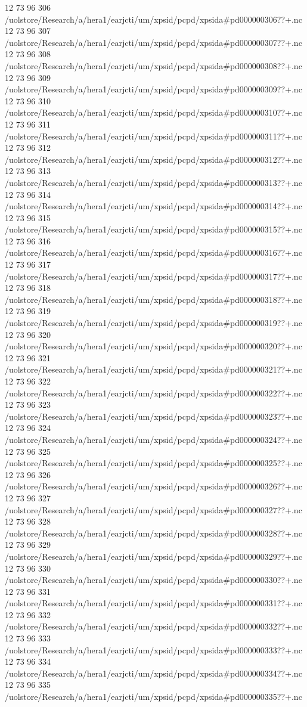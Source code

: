 12 73 96
306
/uolstore/Research/a/hera1/earjcti/um/xpsid/pcpd/xpsida#pd000000306??+.nc
12 73 96
307
/uolstore/Research/a/hera1/earjcti/um/xpsid/pcpd/xpsida#pd000000307??+.nc
12 73 96
308
/uolstore/Research/a/hera1/earjcti/um/xpsid/pcpd/xpsida#pd000000308??+.nc
12 73 96
309
/uolstore/Research/a/hera1/earjcti/um/xpsid/pcpd/xpsida#pd000000309??+.nc
12 73 96
310
/uolstore/Research/a/hera1/earjcti/um/xpsid/pcpd/xpsida#pd000000310??+.nc
12 73 96
311
/uolstore/Research/a/hera1/earjcti/um/xpsid/pcpd/xpsida#pd000000311??+.nc
12 73 96
312
/uolstore/Research/a/hera1/earjcti/um/xpsid/pcpd/xpsida#pd000000312??+.nc
12 73 96
313
/uolstore/Research/a/hera1/earjcti/um/xpsid/pcpd/xpsida#pd000000313??+.nc
12 73 96
314
/uolstore/Research/a/hera1/earjcti/um/xpsid/pcpd/xpsida#pd000000314??+.nc
12 73 96
315
/uolstore/Research/a/hera1/earjcti/um/xpsid/pcpd/xpsida#pd000000315??+.nc
12 73 96
316
/uolstore/Research/a/hera1/earjcti/um/xpsid/pcpd/xpsida#pd000000316??+.nc
12 73 96
317
/uolstore/Research/a/hera1/earjcti/um/xpsid/pcpd/xpsida#pd000000317??+.nc
12 73 96
318
/uolstore/Research/a/hera1/earjcti/um/xpsid/pcpd/xpsida#pd000000318??+.nc
12 73 96
319
/uolstore/Research/a/hera1/earjcti/um/xpsid/pcpd/xpsida#pd000000319??+.nc
12 73 96
320
/uolstore/Research/a/hera1/earjcti/um/xpsid/pcpd/xpsida#pd000000320??+.nc
12 73 96
321
/uolstore/Research/a/hera1/earjcti/um/xpsid/pcpd/xpsida#pd000000321??+.nc
12 73 96
322
/uolstore/Research/a/hera1/earjcti/um/xpsid/pcpd/xpsida#pd000000322??+.nc
12 73 96
323
/uolstore/Research/a/hera1/earjcti/um/xpsid/pcpd/xpsida#pd000000323??+.nc
12 73 96
324
/uolstore/Research/a/hera1/earjcti/um/xpsid/pcpd/xpsida#pd000000324??+.nc
12 73 96
325
/uolstore/Research/a/hera1/earjcti/um/xpsid/pcpd/xpsida#pd000000325??+.nc
12 73 96
326
/uolstore/Research/a/hera1/earjcti/um/xpsid/pcpd/xpsida#pd000000326??+.nc
12 73 96
327
/uolstore/Research/a/hera1/earjcti/um/xpsid/pcpd/xpsida#pd000000327??+.nc
12 73 96
328
/uolstore/Research/a/hera1/earjcti/um/xpsid/pcpd/xpsida#pd000000328??+.nc
12 73 96
329
/uolstore/Research/a/hera1/earjcti/um/xpsid/pcpd/xpsida#pd000000329??+.nc
12 73 96
330
/uolstore/Research/a/hera1/earjcti/um/xpsid/pcpd/xpsida#pd000000330??+.nc
12 73 96
331
/uolstore/Research/a/hera1/earjcti/um/xpsid/pcpd/xpsida#pd000000331??+.nc
12 73 96
332
/uolstore/Research/a/hera1/earjcti/um/xpsid/pcpd/xpsida#pd000000332??+.nc
12 73 96
333
/uolstore/Research/a/hera1/earjcti/um/xpsid/pcpd/xpsida#pd000000333??+.nc
12 73 96
334
/uolstore/Research/a/hera1/earjcti/um/xpsid/pcpd/xpsida#pd000000334??+.nc
12 73 96
335
/uolstore/Research/a/hera1/earjcti/um/xpsid/pcpd/xpsida#pd000000335??+.nc
